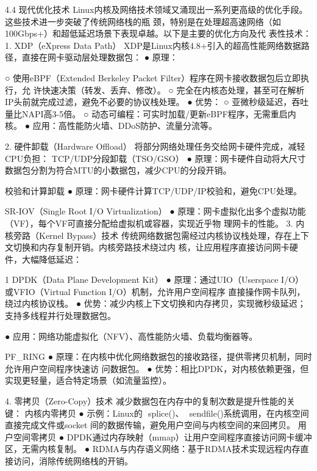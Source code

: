 
4.4 现代优化技术
Linux内核及网络技术领域又涌现出一系列更高级的优化手段。这些技术进一步突破了传统网络栈的瓶
颈，特别是在处理超高速网络（如100Gbps+）和超低延迟场景下表现卓越。以下是主要的优化方向及代
表性技术：
1.   XDP（eXpress Data Path）
XDP是Linux内核4.8+引入的超高性能网络数据路径，直接在网卡驱动层处理数据包：
 ● 原理：

    ○ 使用eBPF（Extended Berkeley Packet Filter）程序在网卡接收数据包后立即执行，允
      许快速决策（转发、丢弃、修改）。
    ○ 完全在内核态处理，甚至可在解析IP头前就完成过滤，避免不必要的协议栈处理。
 ● 优势：
    ○ 亚微秒级延迟，吞吐量比NAPI高3-5倍。
    ○ 动态可编程：可实时加载/更新eBPF程序，无需重启内核。
 ● 应用：高性能防火墙、DDoS防护、流量分流等。


2.   硬件卸载（Hardware Offload）
将部分网络处理任务交给网卡硬件完成，减轻CPU负担：
TCP/UDP分段卸载（TSO/GSO）
 ● 原理：网卡硬件自动将大尺寸数据包分割为符合MTU的小数据包，减少CPU的分段开销。

校验和计算卸载
 ● 原理：网卡硬件计算TCP/UDP/IP校验和，避免CPU处理。

SR-IOV（Single Root I/O Virtualization）
 ● 原理：网卡虚拟化出多个虚拟功能（VF），每个VF可直接分配给虚拟机或容器，实现近乎物
      理网卡的性能。
3.   内核旁路（Kernel Bypass）技术
传统网络数据包需经过内核协议栈处理，存在上下文切换和内存复制开销。内核旁路技术绕过内
核，让应用程序直接访问网卡硬件，大幅降低延迟：

                                                                 1
DPDK（Data Plane Development Kit）
 ● 原理：通过UIO（Userspace I/O）或VFIO（Virtual Function I/O）机制，允许用户空间程序
       直接操作网卡队列，绕过内核协议栈。
     ● 优势：减少内核上下文切换和内存拷贝，实现微秒级延迟；支持多线程并行处理数据包。

     ● 应用：网络功能虚拟化（NFV）、高性能防火墙、负载均衡器等。

PF_RING
 ● 原理：在内核中优化网络数据包的接收路径，提供零拷贝机制，同时允许用户空间程序快速访
       问数据包。
     ● 优势：相比DPDK，对内核依赖更强，但实现更轻量，适合特定场景（如流量监控）。


4.   零拷贝（Zero-Copy）技术
减少数据包在内存中的复制次数是提升性能的关键：
内核内零拷贝
 ● 示例：Linux的 ﻿
             splice()﻿、 ﻿
                        sendfile()﻿系统调用，在内核空间直接完成文件或socket
         间的数据传输，避免用户空间与内核空间的来回拷贝。
用户空间零拷贝
     ● DPDK通过内存映射（mmap）让用户空间程序直接访问网卡缓冲区，无需内核复制。
     ● RDMA与内存语义网络：基于RDMA技术实现远程内存直接访问，消除传统网络栈的开销。


